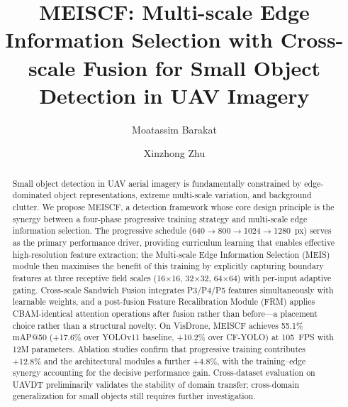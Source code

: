 \documentclass[preprint,12pt]{elsarticle}
\begin{document}
\begin{frontmatter}

\title{MEISCF: Multi-scale Edge Information Selection with Cross-scale Fusion
       for Small Object Detection in UAV Imagery}

\author[zjnu]{Moatassim Barakat}
\author[zjnu]{Xinzhong Zhu}




\begin{abstract}
Small object detection in UAV aerial imagery is fundamentally constrained by
edge-dominated object representations, extreme multi-scale variation, and
background clutter. We propose MEISCF, a detection framework whose core design
principle is the synergy between a four-phase progressive training strategy and
multi-scale edge information selection. The progressive schedule
(640$\to$800$\to$1024$\to$1280~px) serves as the primary performance driver,
providing curriculum learning that enables effective high-resolution feature
extraction; the Multi-scale Edge Information Selection (MEIS) module then
maximises the benefit of this training by explicitly capturing boundary features
at three receptive field scales (16$\times$16, 32$\times$32, 64$\times$64) with
per-input adaptive gating. Cross-scale Sandwich Fusion integrates P3/P4/P5
features simultaneously with learnable weights, and a post-fusion Feature
Recalibration Module (FRM) applies CBAM-identical attention operations after
fusion rather than before---a placement choice rather than a structural novelty.
On VisDrone, MEISCF achieves 55.1\% mAP@50 (+17.6\% over YOLOv11 baseline,
+10.2\% over CF-YOLO) at 105~FPS with 12M parameters. Ablation studies confirm
that progressive training contributes +12.8\% and the architectural modules a
further +4.8\%, with the training--edge synergy accounting for the decisive
performance gain. Cross-dataset evaluation on UAVDT preliminarily validates the
stability of domain transfer; cross-domain generalization for small objects still
requires further investigation.
\end{abstract}


\end{frontmatter}
\end{document}
